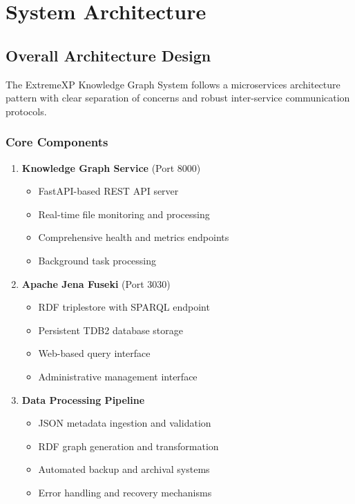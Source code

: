 \documentclass[12pt,a4paper]{article}
\begin{document}
\section{System Architecture}

\subsection{Overall Architecture Design}

The ExtremeXP Knowledge Graph System follows a microservices architecture pattern with clear separation of concerns and robust inter-service communication protocols.

\subsubsection{Core Components}

\begin{enumerate}
    \item \textbf{Knowledge Graph Service} (Port 8000)
    \begin{itemize}
        \item FastAPI-based REST API server
        \item Real-time file monitoring and processing
        \item Comprehensive health and metrics endpoints
        \item Background task processing
    \end{itemize}
    
    \item \textbf{Apache Jena Fuseki} (Port 3030)
    \begin{itemize}
        \item RDF triplestore with SPARQL endpoint
        \item Persistent TDB2 database storage
        \item Web-based query interface
        \item Administrative management interface
    \end{itemize}
    
    \item \textbf{Data Processing Pipeline}
    \begin{itemize}
        \item JSON metadata ingestion and validation
        \item RDF graph generation and transformation
        \item Automated backup and archival systems
        \item Error handling and recovery mechanisms
    \end{itemize}
\end{enumerate}
\end{document}

